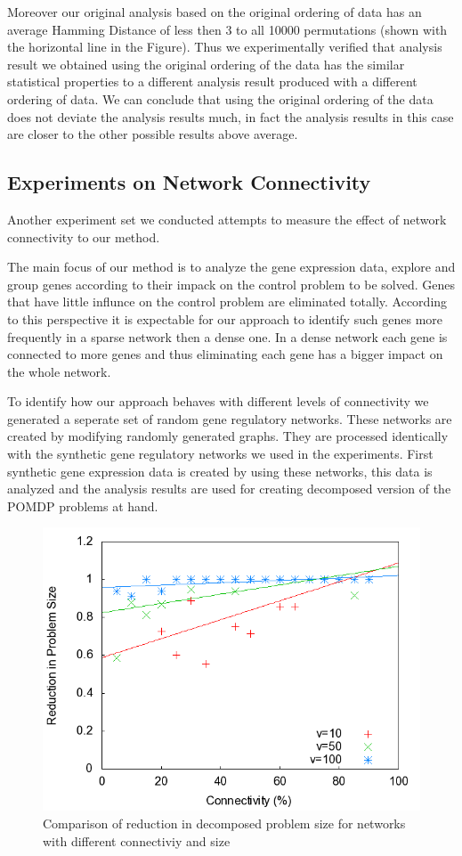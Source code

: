 Moreover our original analysis based on the original ordering of data has an average Hamming Distance of less then 3 to all 10000 permutations (shown with the horizontal line in the Figure). Thus we experimentally verified that analysis result we obtained using the original ordering of the data has the similar statistical properties to a different analysis result produced with a different ordering of data. We can conclude that using the original ordering of the data does not deviate the analysis results much, in fact the analysis results in this case are closer to the other possible results above average.
\subsection{Experiments on Network Connectivity}
Another experiment set we conducted attempts to measure the effect of network connectivity to our method. 

The main focus of our method is to analyze the gene expression data, explore and group genes according to their impack on the control problem to be solved. Genes that have little influnce on the control problem are eliminated totally. According to this perspective it is expectable for our approach to identify such genes more frequently in a sparse network then a dense one. In a dense network each gene is connected to more genes and thus eliminating each gene has a bigger impact on the whole network.

To identify how our approach behaves with different levels of connectivity we generated a seperate set of random gene regulatory networks. These networks are created by modifying randomly generated graphs. They are processed identically with the synthetic gene regulatory networks we used in the experiments. First synthetic gene expression data is created by using these networks, this data is analyzed and the analysis results are used for creating decomposed version of the POMDP problems at hand. 

\begin{figure}
 \centering \includegraphics[scale=0.375]{experiments/graph-connectivity.png}
\caption{Comparison of reduction in decomposed problem size for networks with different connectiviy and size}\label{figure:connectivity}
\end{figure}

